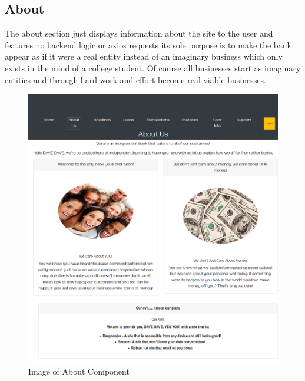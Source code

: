 \subsection{About}
The about section just displays information about the site to the user and features no backend logic or axios requests
its sole purpose is to make the bank appear as if it were a real entity instead of an imaginary business which only
exists in the mind of a college student.  Of course all businesses start as imaginary entities and through hard work
and effort become real viable businesses.
\begin{figure}[H]
\includegraphics[width=\textwidth]{img/aboutcomponent.png}
\caption{Image of About Component}
\label{fig:Image of about component}
\end{figure}
